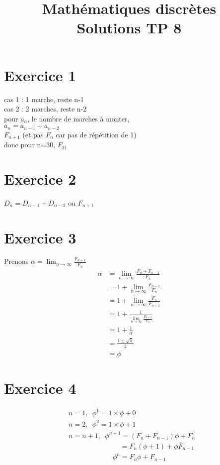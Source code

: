 \documentclass[fontsize=10pt]{article}
\title{\textbf{Mathématiques discrètes}\\ Solutions TP 8}
\date{}
\newcommand\tab[1][1cm]{\hspace*{#1}}
\begin{document}
\maketitle %

\section*{Exercice 1}

cas 1 : 1 marche, reste n-1 \\
cas 2 : 2 marches, reste n-2 \\
\tab pour $a_{n}$, le nombre de marches à monter, \\
\tab \tab $a_{n} = a_{n-1}+a_{n-2}$ \\
\tab \tab $F_{n+1}$ (et pas $F_{n}$ car pas de répétition de 1)\\
\tab \tab donc pour n=30, $F_{31}$

\section*{Exercice 2}
\tab \tab $D_{n} = D_{n-1}+D_{n-2}$ ou $F_{n+1}$ \\

\section*{Exercice 3}
Prenons $\alpha = \lim_{n\to\infty} \frac{F_{n+1}}{F_n}$
\begin{align*}
\alpha &= \lim_{n\to\infty} \frac{F_n + F_{n-1}}{F_n}\\
&= 1 + \lim_{n\to\infty} \frac{F_{n-1}}{F_n}\\
&= 1 + \lim_{n\to\infty} \frac{F_{n}}{F_{n+1}}\\
&= 1 + \frac{1}{\lim_{n\to\infty} \frac{F_{n+1}}{F_{n}}}\\
&= 1 + \frac{1}{\alpha}\\
&= \frac{1 \pm \sqrt{5}}{2}\\
&= \phi
\end{align*}
 
\section*{Exercice 4}
\begin{align*}
& n=1, \phantom{a}\phi^1 = 1 \times \phi + 0\\
& n=2, \phantom{a}\phi^2 = 1 \times \phi + 1\\
& n=n+1, \phantom{a}\phi^{n+1} = (F_n + F_{n-1})\phi + F_n\\
& \phantom{aaaaaaaaaaaaaa}= F_n (\phi + 1) + \phi F_{n-1}\\
& \phantom{aaaaaaaaaaaa}\phi^n = F_n\phi + F_{n-1}
\end{align*}
\end{document}

